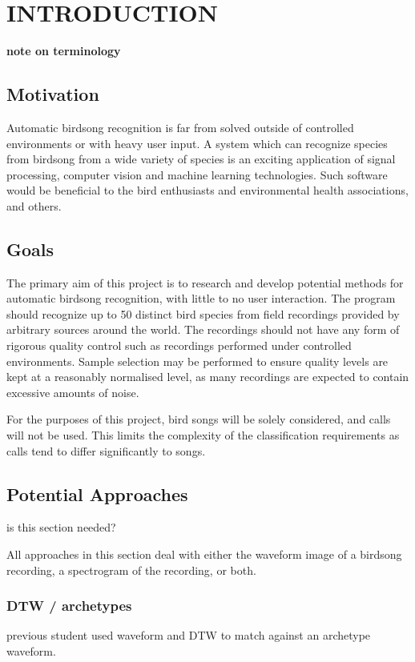 \chapter{INTRODUCTION}

\textbf{note on terminology}

\section{Motivation}
Automatic birdsong recognition is far from solved outside of controlled
environments or with heavy user input.
A system which can recognize species from birdsong from a wide variety of
species is an exciting application of signal processing, computer vision and
machine learning technologies.
Such software would be beneficial to the bird enthusiasts and environmental
health associations, and others.

\section{Goals}
The primary aim of this project is to research and develop potential methods
for automatic birdsong recognition, with little to no user interaction.
The program should recognize up to 50 distinct bird species from field recordings
provided by arbitrary sources around the world.
The recordings should not have any form of rigorous quality control such as
recordings performed under controlled environments.
Sample selection may be performed to ensure quality levels are kept at a
reasonably normalised level, as many recordings are expected to contain
excessive amounts of noise.

For the purposes of this project, bird songs will be solely considered, and calls
will not be used.
This limits the complexity of the classification requirements as calls tend to
differ significantly to songs.

\section{Potential Approaches}
is this section needed?

All approaches in this section deal with either the waveform image of a birdsong
recording, a spectrogram of the recording, or both.

\subsection{DTW / archetypes}
previous student used waveform and DTW to match against an archetype waveform.

